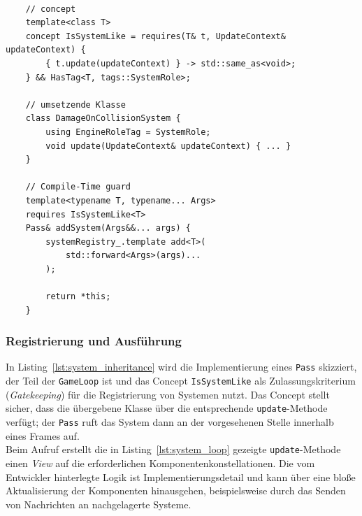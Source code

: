 \vspace{5mm}
\begin{lstlisting}[style=c++style,
    caption={Auszug aus dem Quellcode der beteiligten Klassen und Concepts zur Erstellung von Systemen in \textit{helios}. Systeme müssen von keinem bestimmten Basistyp erben, dafür aber eine \texttt{update}-Methode besitzen, die einen \texttt{UpdateContext} als Argument entgegennimmt. Die Rolle eines Systems wird über Tags ausgedrückt, die über Concepts zur Kompilierzeit überprüft werden.},
    label=lst:system_inheritance]

    // concept
    template<class T>
    concept IsSystemLike = requires(T& t, UpdateContext& updateContext) {
        { t.update(updateContext) } -> std::same_as<void>;
    } && HasTag<T, tags::SystemRole>;

    // umsetzende Klasse
    class DamageOnCollisionSystem {
        using EngineRoleTag = SystemRole;
        void update(UpdateContext& updateContext) { ... }
    }

    // Compile-Time guard
    template<typename T, typename... Args>
    requires IsSystemLike<T>
    Pass& addSystem(Args&&... args) {
        systemRegistry_.template add<T>(
            std::forward<Args>(args)...
        );

        return *this;
    }

\end{lstlisting}

\subsubsection{Registrierung und Ausführung}

In Listing~\ref{lst:system_inheritance} wird die Implementierung eines \texttt{Pass} skizziert, der Teil der \texttt{GameLoop} ist und das Concept \texttt{IsSystemLike} als Zulassungskriterium (\textit{Gatekeeping}) für die Registrierung von Systemen nutzt.
Das Concept stellt sicher, dass die übergebene Klasse über die entsprechende \texttt{update}-Methode verfügt; der \texttt{Pass} ruft das System dann an der vorgesehenen Stelle innerhalb eines Frames auf.\\

Beim Aufruf erstellt die in Listing~\ref{lst:system_loop} gezeigte \texttt{update}-Methode einen \textit{View} auf die erforderlichen Komponentenkonstellationen.
Die vom Entwickler hinterlegte Logik ist Implementierungsdetail und kann über eine bloße Aktualisierung der Komponenten hinausgehen, beispielsweise durch das Senden von Nachrichten an nachgelagerte Systeme.


